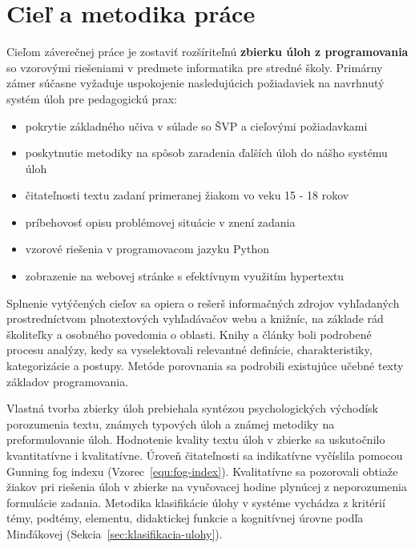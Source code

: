 \chapter{Cieľ a metodika práce}
Cieľom záverečnej práce je zostaviť rozšíriteľnú \textbf{zbierku úloh z programovania} so vzorovými riešeniami v predmete informatika pre stredné školy. Primárny zámer súčasne vyžaduje uspokojenie nasledujúcich požiadaviek na navrhnutý systém úloh pre pedagogickú prax:

\begin{itemize}[noitemsep]
\item pokrytie základného učiva v súlade so ŠVP a cieľovými požiadavkami
\item poskytnutie metodiky na spôsob zaradenia ďalších úloh do nášho systému úloh
\item čitateľnosti textu zadaní primeranej žiakom vo veku 15 - 18 rokov
\item príbehovosť opisu problémovej situácie v znení zadania
\item vzorové riešenia v programovacom jazyku Python
\item zobrazenie na webovej stránke s efektívnym využitím hypertextu
\end{itemize}

Splnenie vytýčených cieľov sa opiera o rešerš informačných zdrojov vyhľadaných prostredníctvom plnotextových vyhľadávačov webu a knižníc, na základe rád školiteľky a osobného povedomia o oblasti. Knihy a články boli podrobené procesu analýzy, kedy sa vyselektovali relevantné definície, charakteristiky, kategorizácie a postupy. Metóde porovnania sa podrobili existujúce učebné texty základov programovania.

Vlastná tvorba zbierky úloh prebiehala syntézou psychologických východísk porozumenia textu, známych typových úloh a známej metodiky na preformulovanie úloh. Hodnotenie kvality textu úloh v zbierke sa uskutočnilo kvantitatívne i kvalitatívne. Úroveň čitateľnosti sa indikatívne vyčíslila pomocou Gunning fog indexu (Vzorec~\ref{equ:fog-index}). Kvalitatívne sa pozorovali obtiaže žiakov pri riešenia úloh v zbierke na vyučovacej hodine plynúcej z neporozumenia formulácie zadania. Metodika klasifikácie úlohy v systéme vychádza z kritérií témy, podtémy, elementu, didaktickej funkcie a kognitívnej úrovne podľa Minďákovej (Sekcia~\ref{sec:klasifikacia-ulohy}).